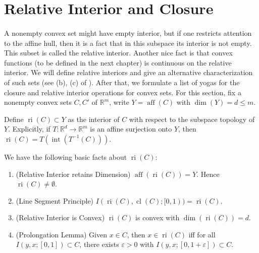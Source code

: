 \section{Relative Interior and Closure}
\label{sect:012}

\paragraph{}A nonempty convex set might have empty interior, but if one restricts attention to the affine hull, then it is a fact that in this subspace its interior is not empty. This subset is called the relative interior. Another nice fact is that convex functions (to be defined in the next chapter) is continuous on the relative interior. We will define relative interiors and give an alternative characterization of such sets (see (b), (c) of ). After that, we formulate a list of yogas for the closure and relative interior operations for convex sets. For this section, fix a nonempty convex sets $C,C'$ of $\mathbb{R}^m$, write $Y=\operatorname{aff}(C)$ with $\dim(Y)=d\leq m$.

\begin{defn}
	\label{defn:012-relint}
	Define $\operatorname{ri}(C)\subset Y$ as the interior of $C$ with respect to the subspace topology of $Y$. Explicitly, if $T:\mathbb{R}^d\to \mathbb{R}^m$ is an affine surjection onto $Y$, then $\operatorname{ri}(C)=T (\operatorname{int}(T^{-1}(C)))$.
\end{defn}

\begin{prop}We have the following basic facts about $\operatorname{ri}(C)$:
	\label{prop:012-basic-ri}
	\begin{enumerate}[label=(\alph*)]
		\item (Relative Interior retains Dimension) $\operatorname{aff}(\operatorname{ri}(C))=Y$. Hence $\operatorname{ri}(C)\neq\emptyset$.
		\item (Line Segment Principle) $I(\operatorname{ri}(C),\operatorname{cl}(C);[0,1))=\operatorname{ri}(C)$.
		\item (Relative Interior is Convex) $\operatorname{ri}(C)$ is convex with $\operatorname{dim}(\operatorname{ri}(C))=d$.
		\item (Prolongation Lemma) Given $x\in C$, then $x\in \operatorname{ri}(C)$ iff for all $I(y,x;[0,1])\subset C$, there exists $\varepsilon>0$ with $I(y,x;[0,1+\varepsilon ])\subset C$.
	\end{enumerate}
\end{prop}

